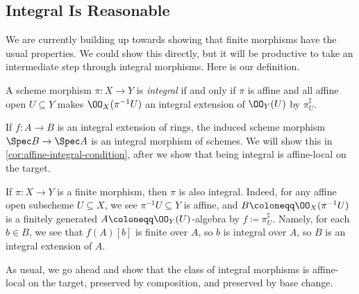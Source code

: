 \documentclass[../notes.tex]{subfiles}
\begin{document}
\subsection{Integral Is Reasonable}
We are currently building up towards showing that finite morphisms have the usual properties. We could show this directly, but it will be productive to take an intermediate step through integral morphisms. Here is our definition.
\begin{definition}
	A scheme morphism $\pi\colon X\to Y$ is \textit{integral} if and only if $\pi$ is affine and all affine open $U\subseteq Y$ makes $\OO_X(\pi^{-1}U)$ an integral extension of $\OO_Y(U)$ by $\pi^\sharp_U$.
\end{definition}
\begin{example}
	If $f\colon A\to B$ is an integral extension of rings, the induced scheme morphism $\Spec B\to\Spec A$ is an integral morphism of schemes. We will show this in \autoref{cor:affine-integral-condition}, after we show that being integral is affine-local on the target.
\end{example}
\begin{example} \label{ex:finite-is-integral}
	If $\pi\colon X\to Y$ is a finite morphism, then $\pi$ is also integral. Indeed, for any affine open subscheme $U\subseteq X$, we see $\pi^{-1}U\subseteq Y$ is affine, and $B\coloneqq\OO_X(\pi^{-1}U)$ is a finitely generated $A\coloneqq\OO_Y(U)$-algebra by $f\coloneqq\pi^\sharp_U$. Namely, for each $b\in B$, we see that $f(A)[b]$ is finite over $A$, so $b$ is integral over $A$, so $B$ is an integral extension of $A$.
\end{example}
As usual, we go ahead and show that the class of integral morphisms is affine-local on the target, preserved by composition, and preserved by base change.
\end{document}
